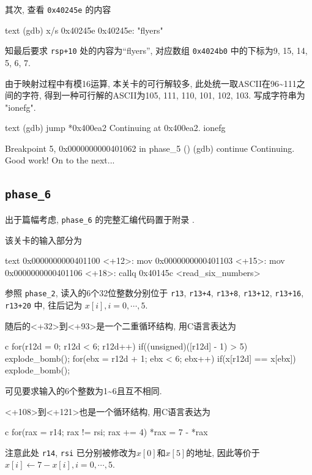 其次, 查看 \verb|0x40245e| 的内容
\begin{code}{text}
(gdb) x/s 0x40245e
0x40245e:       "flyers"
\end{code}
知最后要求 \verb|rsp+10| 处的内容为“flyers”, 对应数组 \verb|0x4024b0| 中的下标为9, 15, 14, 5, 6, 7. 

由于映射过程中有模16运算, 本关卡的可行解较多, 此处统一取ASCII在96\textasciitilde111之间的字符, 得到一种可行解的ASCII为105, 111, 110, 101, 102, 103. 写成字符串为 "ionefg".

\begin{code}{text}
(gdb) jump *0x400ea2
Continuing at 0x400ea2.
ionefg

Breakpoint 5, 0x0000000000401062 in phase_5 ()
(gdb) continue
Continuing.
Good work!  On to the next...
\end{code}

\subsection{\texttt{phase_6}}

出于篇幅考虑, \verb|phase_6| 的完整汇编代码置于附录 . 

该关卡的输入部分为
\begin{code}{text}
0x0000000000401100 <+12>:    mov    %
0x0000000000401103 <+15>:    mov    %
0x0000000000401106 <+18>:    callq  0x40145c <read_six_numbers>
\end{code}
参照 \verb|phase_2|, 读入的6个32位整数分别位于  \verb|r13|, \verb|r13+4|, \verb|r13+8|, \verb|r13+12|, \verb|r13+16|, \verb|r13+20| 中, 往后记为 $x[i],i=0,\cdots,5$. 

随后的<+32>到<+93>是一个二重循环结构, 用C语言表达为
\begin{code}{c}
for(r12d = 0; r12d < 6; r12d++) {
    if((unsigned)([r12d] - 1) > 5) explode_bomb();
    for(ebx = r12d + 1; ebx < 6; ebx++) 
        if(x[r12d] == x[ebx]) explode_bomb();
}
\end{code}
可见要求输入的6个整数为1\textasciitilde6且互不相同.

<+108>到<+121>也是一个循环结构, 用C语言表达为
\begin{code}{c}
for(rax = r14; rax != rsi; rax += 4)
    *rax = 7 - *rax
\end{code}
注意此处 \verb|r14|, \verb|rsi| 已分别被修改为$x[0]$和$x[5]$的地址, 因此等价于$x[i] \leftarrow 7-x[i], i=0,\cdots,5$.

